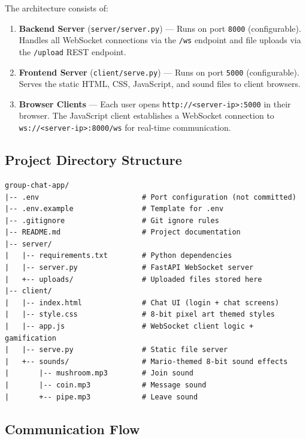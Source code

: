 \documentclass[12pt, a4paper]{article}
\begin{document}
The architecture consists of:

\begin{enumerate}[leftmargin=*]
    \item \textbf{Backend Server} (\texttt{server/server.py}) — Runs on port \texttt{8000} (configurable). Handles all WebSocket connections via the \texttt{/ws} endpoint and file uploads via the \texttt{/upload} REST endpoint.

    \item \textbf{Frontend Server} (\texttt{client/serve.py}) — Runs on port \texttt{5000} (configurable). Serves the static HTML, CSS, JavaScript, and sound files to client browsers.

    \item \textbf{Browser Clients} — Each user opens \texttt{http://<server-ip>:5000} in their browser. The JavaScript client establishes a WebSocket connection to \texttt{ws://<server-ip>:8000/ws} for real-time communication.
\end{enumerate}

\subsection{Project Directory Structure}

\begin{lstlisting}[language={}, caption={Project Directory Structure}, label={lst:structure}]
group-chat-app/
|-- .env                        # Port configuration (not committed)
|-- .env.example                # Template for .env
|-- .gitignore                  # Git ignore rules
|-- README.md                   # Project documentation
|-- server/
|   |-- requirements.txt        # Python dependencies
|   |-- server.py               # FastAPI WebSocket server
|   +-- uploads/                # Uploaded files stored here
|-- client/
|   |-- index.html              # Chat UI (login + chat screens)
|   |-- style.css               # 8-bit pixel art themed styles
|   |-- app.js                  # WebSocket client logic + gamification
|   |-- serve.py                # Static file server
|   +-- sounds/                 # Mario-themed 8-bit sound effects
|       |-- mushroom.mp3        # Join sound
|       |-- coin.mp3            # Message sound
|       +-- pipe.mp3            # Leave sound
\end{lstlisting}

\subsection{Communication Flow}
\end{document}
